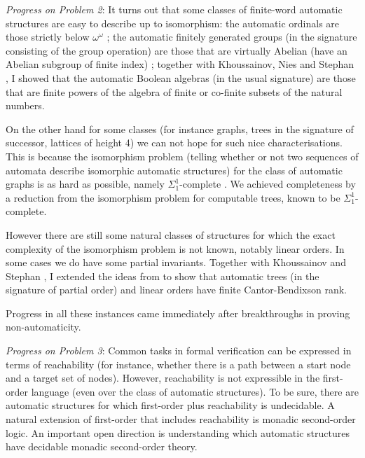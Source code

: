 \documentclass[12pt]{article}
\theoremstyle{plain} \numberwithin{equation}{section}
\theoremstyle{definition}
\begin{document}
{\em Progress on Problem 2}:
It turns out that some classes of finite-word automatic structures are easy to describe up to isomorphism: the automatic ordinals are those strictly below $\omega^\omega$ \cite{Delh04}; the automatic finitely generated groups (in the signature consisting of the group operation) are those that are virtually Abelian (have an Abelian subgroup of finite index) \cite{OlTh05};
together with Khoussainov, Nies and Stephan \cite{KNRS04}, I showed that the automatic Boolean algebras (in the usual signature) are those that are finite powers of the algebra of finite or co-finite subsets of the natural numbers.

On the other hand for some classes (for instance graphs, trees in the signature of successor, lattices of height 4) we can not hope for such nice characterisations. This is because the isomorphism problem (telling whether or not two sequences of automata describe isomorphic automatic structures) for the class of automatic graphs is as hard as possible, namely $\Sigma_1^1$-complete \cite{KNRS04}. We achieved completeness by a reduction from the isomorphism problem for computable trees, known to be $\Sigma_1^1$-complete.

However there are still some natural classes of structures for which the exact complexity of the isomorphism problem is not known, notably linear orders.
In some cases we do have some partial invariants. Together with Khoussainov and Stephan \cite{KRS05}, I extended the ideas from \cite{Delh04} to show that automatic trees (in the signature of partial order) and linear orders have finite Cantor-Bendixson rank. 

Progress in all these instances came immediately after breakthroughs in proving non-automaticity.


{\em Progress on Problem 3}:
Common tasks in formal verification can be expressed in terms of reachability (for instance, whether there is a path between a start node and a target set of nodes). However, reachability is not expressible in the first-order language (even over the class of automatic structures). To be sure, there are automatic structures for which first-order plus reachability is undecidable. A natural extension of first-order that includes reachability is monadic second-order logic. An important open direction is understanding which automatic structures have decidable monadic second-order theory.
\end{document}

